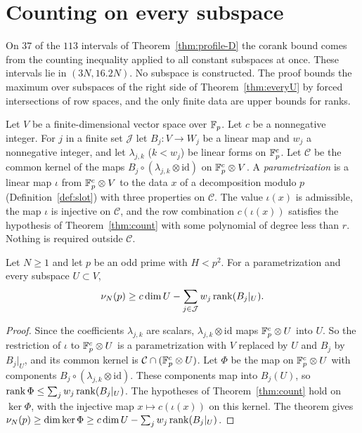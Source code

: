 \section{Counting on every subspace}\label{app:windows}

On $37$ of the $113$ intervals of Theorem~\ref{thm:profile-D} the corank bound comes from the counting
inequality applied to all constant subspaces at once. These intervals lie in $(3N,16.2N)$. No subspace is
constructed. The proof bounds the maximum over subspaces of the right side of Theorem~\ref{thm:everyU} by forced intersections of row spaces, and the
only finite data are upper bounds for ranks.

Let $V$ be a finite-dimensional vector space over $\mathbb F_p$. Let $c$ be a nonnegative integer. For $j$ in a finite
set $\mathcal J$ let $B_j\colon V\to W_j$ be a linear map and $w_j$ a nonnegative integer, and let $\lambda_{j,k}$ ($k<w_j$) be linear forms on
$\mathbb F_p^c$. Let $\mathcal C$ be the common kernel of the maps $B_j\circ(\lambda_{j,k}\otimes\mathrm{id})$ on $\mathbb F_p^c\otimes V$. A \emph{parametrization} is a linear map
$\iota$ from $\mathbb F_p^c\otimes V$ to the data $x$ of a decomposition modulo $p$ (Definition~\ref{def:slot}) with three properties on $\mathcal C$. The value
$\iota(x)$ is admissible, the map $\iota$ is injective on $\mathcal C$, and the row combination $c(\iota(x))$ satisfies the hypothesis of
Theorem~\ref{thm:count} with some polynomial of degree less than $r$. Nothing is required outside $\mathcal C$.

\begin{theorem}\label{thm:everyU}
Let $N\ge1$ and let $p$ be an odd prime with $H<p^2$. For a parametrization and every subspace $U\subset V$,
\[
 \nu_N(p)\ge c\dim U-\sum_{j\in\mathcal J}w_j\operatorname{rank}(B_j|_U).
\]
\end{theorem}

\begin{proof}
Since the coefficients $\lambda_{j,k}$ are scalars, $\lambda_{j,k}\otimes\mathrm{id}$ maps $\mathbb F_p^c\otimes U$ into $U$. So the restriction of $\iota$ to $\mathbb F_p^c\otimes U$ is
a parametrization with $V$ replaced by $U$ and $B_j$ by $B_j|_U$, and its common kernel is $\mathcal C\cap(\mathbb F_p^c\otimes U)$. Let $\Phi$ be the map on $\mathbb F_p^c\otimes U$ with
components $B_j\circ(\lambda_{j,k}\otimes\mathrm{id})$. These components map into $B_j(U)$, so $\operatorname{rank}\Phi\le\sum_jw_j\operatorname{rank}(B_j|_U)$. The
hypotheses of Theorem~\ref{thm:count} hold on $\ker\Phi$, with the injective map $x\mapsto c(\iota(x))$ on this kernel. The theorem gives
$\nu_N(p)\ge\dim\ker\Phi\ge c\dim U-\sum_jw_j\operatorname{rank}(B_j|_U)$.
\end{proof}

